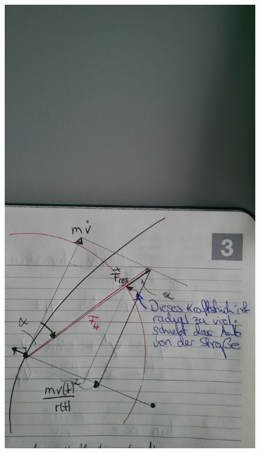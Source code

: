 \documentclass[
10pt, %
a4paper, %
oneside, %
headinclude,footinclude, %
BCOR5mm, %
]{scrartcl}
\begin{document}
 \begin{figure}[t]
    \centering
    \includegraphics[angle = 270, scale=0.1]{pic}
\end{figure} 
\end{document}
